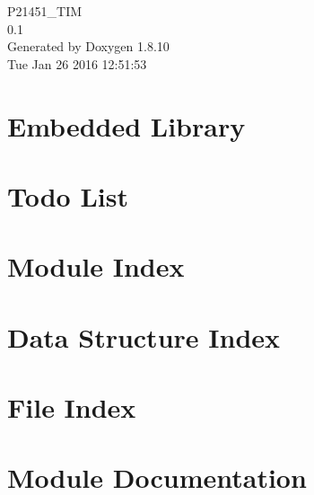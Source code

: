 \documentclass[twoside]{book}
\newcommand{\+}{\discretionary{\mbox{\scriptsize$\hookleftarrow$}}{}{}}
\newcommand{\clearemptydoublepage}{%
  \newpage{\pagestyle{empty}\cleardoublepage}%
}
\begin{document}
\hypersetup{pageanchor=false,
             bookmarks=true,
             bookmarksnumbered=true,
             pdfencoding=unicode
            }
\begin{titlepage}
\vspace*{7cm}
\begin{center}%
{\Large P21451\+\_\+\+T\+I\+M \\[1ex]\large 0.\+1 }\\
\vspace*{1cm}
{\large Generated by Doxygen 1.8.10}\\
\vspace*{0.5cm}
{\small Tue Jan 26 2016 12:51:53}\\
\end{center}
\end{titlepage}
\clearemptydoublepage
\tableofcontents
\clearemptydoublepage
{}
\hypersetup{pageanchor=true}

\chapter{Embedded Library}
\label{index}\hypertarget{index}{}
\chapter{Todo List}
\label{todo}
\hypertarget{todo}{}

\chapter{Module Index}

\chapter{Data Structure Index}

\chapter{File Index}

\chapter{Module Documentation}













\end{document}

